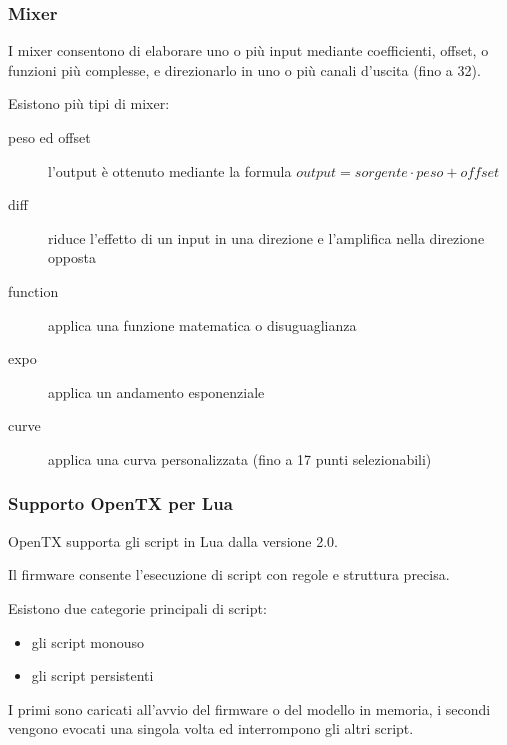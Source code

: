 \documentclass{beamer}
\begin{document}
\begin{frame}
        \frametitle{Mixer}
        
        I mixer consentono di elaborare uno o più input mediante coefficienti, offset, o funzioni più complesse, e direzionarlo in uno o più canali d'uscita (fino a 32).
        

        Esistono più tipi di mixer:
        
        \begin{description}
                \item[peso ed offset] l'output è ottenuto mediante la formula $output = sorgente \cdot peso + offset$
        
                \item[diff] riduce l'effetto di un input in una direzione e l'amplifica nella direzione opposta
        
                \item[function] applica una funzione matematica o disuguaglianza
        
                \item[expo] applica un andamento esponenziale
        
                \item[curve] applica una curva personalizzata (fino a 17 punti selezionabili)
        \end{description}
\end{frame}

\begin{frame}
        \frametitle{Supporto OpenTX per Lua}

        OpenTX supporta gli script in Lua dalla versione 2.0. 
        

        Il firmware consente l'esecuzione di script con regole e struttura precisa.
        

        Esistono due categorie principali di script:
        
        \begin{itemize}
                \item gli script monouso
        
                \item gli script persistenti
        
        \end{itemize}

        I primi sono caricati all'avvio del firmware o del modello in memoria, i secondi vengono evocati una singola volta ed interrompono gli altri script.
\end{frame}
\end{document}

